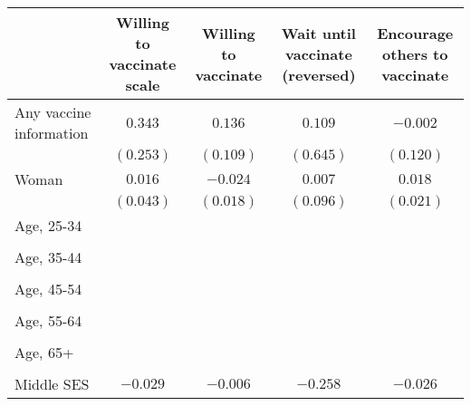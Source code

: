 \begin{table}
\begin{center}
\begin{tabular}{l c c c c}
\hline
 & Willing to vaccinate scale & Willing to vaccinate & Wait until vaccinate (reversed) & Encourage others to vaccinate \\
\hline
Any vaccine information                                   & $0.343$     & $0.136$     & $0.109$       & $-0.002$  \\
                                                          & $(0.253)$   & $(0.109)$   & $(0.645)$     & $(0.120)$ \\
Woman                                                     & $0.016$     & $-0.024$    & $0.007$       & $0.018$   \\
                                                          & $(0.043)$   & $(0.018)$   & $(0.096)$     & $(0.021)$ \\
Age, 25-34                                                &             &             &               &           \\
                                                          &             &             &               &           \\
Age, 35-44                                                &             &             &               &           \\
                                                          &             &             &               &           \\
Age, 45-54                                                &             &             &               &           \\
                                                          &             &             &               &           \\
Age, 55-64                                                &             &             &               &           \\
                                                          &             &             &               &           \\
Age, 65+                                                  &             &             &               &           \\
                                                          &             &             &               &           \\
Middle SES                                                & $-0.029$    & $-0.006$    & $-0.258$      & $-0.026$  \\

\end{tabular}
\end{center}
\end{table}
